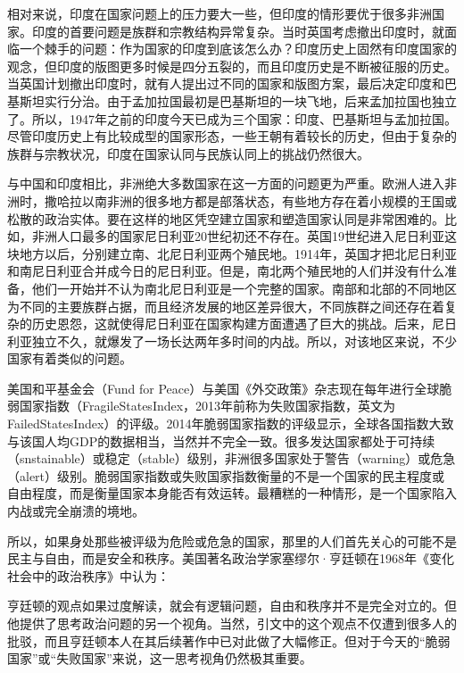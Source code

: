相对来说，印度在国家问题上的压力要大一些，但印度的情形要优于很多非洲国家。印度的首要问题是族群和宗教结构异常复杂。当时英国考虑撤出印度时，就面临一个棘手的问题：作为国家的印度到底该怎么办？印度历史上固然有印度国家的观念，但印度的版图更多时候是四分五裂的，而且印度历史是不断被征服的历史。当英国计划撤出印度时，就有人提出过不同的国家和版图方案，最后决定印度和巴基斯坦实行分治。由于孟加拉国最初是巴基斯坦的一块飞地，后来孟加拉国也独立了。所以，1947年之前的印度今天已成为三个国家：印度、巴基斯坦与孟加拉国。尽管印度历史上有比较成型的国家形态，一些王朝有着较长的历史，但由于复杂的族群与宗教状况，印度在国家认同与民族认同上的挑战仍然很大。

与中国和印度相比，非洲绝大多数国家在这一方面的问题更为严重。欧洲人进入非洲时，撒哈拉以南非洲的很多地方都是部落状态，有些地方存在着小规模的王国或松散的政治实体。要在这样的地区凭空建立国家和塑造国家认同是非常困难的。比如，非洲人口最多的国家尼日利亚20世纪初还不存在。英国19世纪进入尼日利亚这块地方以后，分别建立南、北尼日利亚两个殖民地。1914年，英国才把北尼日利亚和南尼日利亚合并成今日的尼日利亚。但是，南北两个殖民地的人们并没有什么准备，他们一开始并不认为南北尼日利亚是一个完整的国家。南部和北部的不同地区为不同的主要族群占据，而且经济发展的地区差异很大，不同族群之间还存在着复杂的历史恩怨，这就使得尼日利亚在国家构建方面遭遇了巨大的挑战。后来，尼日利亚独立不久，就爆发了一场长达两年多时间的内战。所以，对该地区来说，不少国家有着类似的问题。

美国和平基金会（Fund for Peace）与美国《外交政策》杂志现在每年进行全球脆弱国家指数（FragileStatesIndex，2013年前称为失败国家指数，英文为FailedStatesIndex）的评级。2014年脆弱国家指数的评级显示，全球各国指数大致与该国人均GDP的数据相当，当然并不完全一致。很多发达国家都处于可持续（snstainable）或稳定（stable）级别，非洲很多国家处于警告（warning）或危急（alert）级别。脆弱国家指数或失败国家指数衡量的不是一个国家的民主程度或自由程度，而是衡量国家本身能否有效运转。最糟糕的一种情形，是一个国家陷入内战或完全崩溃的境地。

所以，如果身处那些被评级为危险或危急的国家，那里的人们首先关心的可能不是民主与自由，而是安全和秩序。美国著名政治学家塞缪尔·亨廷顿在1968年《变化社会中的政治秩序》中认为：


亨廷顿的观点如果过度解读，就会有逻辑问题，自由和秩序并不是完全对立的。但他提供了思考政治问题的另一个视角。当然，引文中的这个观点不仅遭到很多人的批驳，而且亨廷顿本人在其后续著作中已对此做了大幅修正。但对于今天的“脆弱国家”或“失败国家”来说，这一思考视角仍然极其重要。

